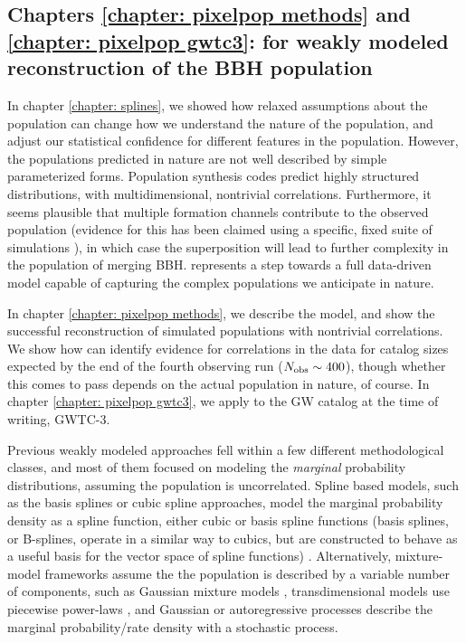 \begin{refsection}
\subsection{Chapters \ref{chapter: pixelpop methods} and \ref{chapter: pixelpop gwtc3}: \PixelPop for weakly modeled reconstruction of the \ac{BBH} population}

In chapter \ref{chapter: splines}, we showed how relaxed assumptions about the population can change how we understand the nature of the population, and adjust our statistical confidence for different features in the population. However, the populations predicted in nature are not well described by simple parameterized forms. Population synthesis codes predict highly structured distributions, with multidimensional, nontrivial correlations. Furthermore, it seems plausible that multiple formation channels contribute to the observed population (evidence for this has been claimed using a specific, fixed suite of simulations \citep{Zevin:2020gbd}), in which case the superposition will lead to further complexity in the population of merging \ac{BBH}. \PixelPop represents a step towards a full data-driven model capable of capturing the complex populations we anticipate in nature.

In chapter \ref{chapter: pixelpop methods}, we describe the \PixelPop model, and show the successful reconstruction of simulated populations with nontrivial correlations. We show how \PixelPop can identify evidence for correlations in the data for catalog sizes expected by the end of the fourth observing run ($N_{\rm obs}\sim 400$), though whether this comes to pass depends on the actual population in nature, of course. 
In chapter \ref{chapter: pixelpop gwtc3}, we apply \PixelPop to the \ac{GW} catalog at the time of writing, \ac{GWTC-3}.

Previous weakly modeled approaches fell within a few different methodological classes, and most of them focused on modeling the \textit{marginal} probability distributions, assuming the population is uncorrelated. Spline based models, such as the basis splines or cubic spline approaches, model the marginal probability density as a spline function, either cubic or basis spline functions (basis splines, or B-splines, operate in a similar way to cubics, but are constructed to behave as a useful basis for the vector space of spline functions) \citep[e.g.,][]{Golomb:2022bon, Edelman:2022ydv, Godfrey:2023oxb}. Alternatively, mixture-model frameworks assume the the population is described by a variable number of components, such as Gaussian mixture models \cite[e.g.,][]{Rinaldi:2021bhm, Tiwari:2020vym}, transdimensional models use piecewise power-laws \cite{Toubiana:2023egi}, and Gaussian \cite{Mandel:2016prl, KAGRA:2021duu, Ray:2023upk, Farah:2024xub} or autoregressive \cite{Callister:2023tgi} processes describe the marginal probability/rate density with a stochastic process. 


\end{refsection}
